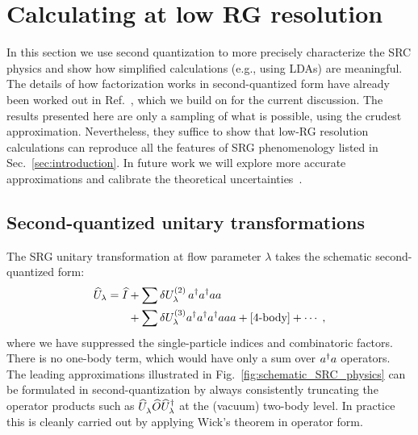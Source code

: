 \documentclass[10pt,aps,prc,floatfix,twocolumn,nofootinbib]{revtex4-1}
\begin{document}
\section{Calculating at low RG resolution} \label{sec:low_resolution}

In this section we use second quantization to more precisely characterize the SRC physics and show how simplified calculations (e.g., using LDAs) are meaningful.
The details of how factorization works in second-quantized form have already been worked out in Ref.~\cite{Bogner:2012zm}, which we build on for the current discussion.
The results presented here are only a sampling of what is possible, using the crudest approximation.
Nevertheless, they suffice to show that low-RG resolution calculations can reproduce all the features of SRG phenomenology listed in Sec.~\ref{sec:introduction}.
In future work we will explore more accurate approximations and calibrate the theoretical uncertainties~\cite{Tropiano:2021prep}.

\subsection{Second-quantized unitary transformations}
\label{subsec:second-quantization}


The SRG unitary transformation at flow parameter $\lambda$ takes the schematic second-quantized form:
%
\begin{align} 
    \Uhat_\lambda = \Ihat 
     &+ \sum  \delta U^{(2)}_\lambda \,
    \akdag\akdag aa
    \notag\\ 
    \null &+ \sum \delta U^{(3)}_\lambda\akdag\akdag\akdag aaa
     + [\mbox{4-body}] + \cdots
    \;,  \label{eq:Uschematic} 
\end{align}
%
where we have suppressed the single-particle indices and combinatoric factors.
There is no one-body term, which would have only a sum over $a^{\dagger} a$ operators.
The leading approximations illustrated in Fig.~\ref{fig:schematic_SRC_physics} can be formulated in second-quantization by always consistently truncating the operator products such as $\Uhatlam \widehat O \Uhatlamdag$ at the (vacuum) two-body level. 
In practice this is cleanly carried out by applying Wick's theorem in operator form.
\end{document}
